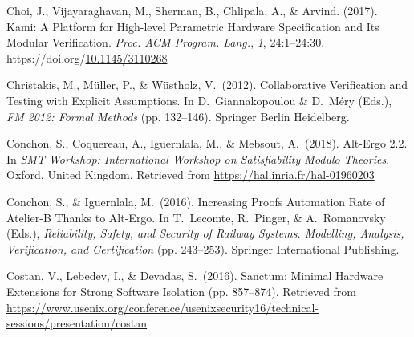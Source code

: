 \documentclass[12pt,twoside]{article}
\begin{document}
{\begin{thebibliography}{222}
Choi, J., Vijayaraghavan, M., Sherman, B., Chlipala, A., \& Arvind. (2017). Kami: A Platform for High-level Parametric Hardware Specification and Its Modular Verification. \emph{Proc. ACM Program. Lang.}, \emph{1}, 24:1–24:30. https://doi.org/\href{https://dx.doi.org/10.1145/3110268}{10.1145/3110268}\label{choi_kami:_2017}%

Christakis, M., Müller, P., \& Wüstholz, V.~(2012). Collaborative Verification and Testing with Explicit Assumptions. In D.~Giannakopoulou \& D.~Méry (Eds.), \emph{FM 2012: Formal Methods} (pp. 132–146). Springer Berlin Heidelberg.\label{christakis_collaborative_2012}%

Conchon, S., Coquereau, A., Iguernlala, M., \& Mebsout, A.~(2018). Alt-Ergo 2.2. In \emph{SMT Workshop: International Workshop on Satisfiability Modulo Theories}. Oxford, United Kingdom. Retrieved from \href{https://hal.inria.fr/hal-01960203}{{\ttfamily https://\hspace{0pt}hal.\hspace{0pt}inria.\hspace{0pt}fr/\hspace{0pt}hal-\hspace{0pt}01960203}}\label{conchon_alt-ergo_2018}%

Conchon, S., \& Iguernlala, M.~(2016). Increasing Proofs Automation Rate of Atelier-B Thanks to Alt-Ergo. In T.~Lecomte, R.~Pinger, \& A.~Romanovsky (Eds.), \emph{Reliability, Safety, and Security of Railway Systems. Modelling, Analysis, Verification, and Certification} (pp. 243–253). Springer International Publishing.\label{conchon_increasing_2016}%

Costan, V., Lebedev, I., \& Devadas, S.~(2016). Sanctum: Minimal Hardware Extensions for Strong Software Isolation (pp. 857–874). Retrieved from \href{https://www.usenix.org/conference/usenixsecurity16/technical-sessions/presentation/costan}{{\ttfamily https://\hspace{0pt}www.\hspace{0pt}usenix.\hspace{0pt}org/\hspace{0pt}conference/\hspace{0pt}usenixsecurity16/\hspace{0pt}technical-\hspace{0pt}sessions/\hspace{0pt}presentation/\hspace{0pt}costan}}\label{costan_sanctum:_2016}%


\end{thebibliography}}
\end{document}
